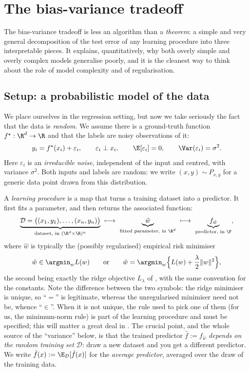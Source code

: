 \section{The bias-variance tradeoff}
\label{sec:bias-variance}

The bias-variance tradeoff is less an algorithm than a \emph{theorem}: a simple
and very general decomposition of the test error of any learning procedure into
three interpretable pieces. It explains, quantitatively, why both overly simple
and overly complex models generalise poorly, and it is the cleanest way to think
about the role of model complexity and of regularisation.

\subsection{Setup: a probabilistic model of the data}

We place ourselves in the regression setting, but now we take seriously the fact
that the data is \emph{random}. We assume there is a ground-truth function
$f^\star : \R^d \to \R$ and that the labels are noisy observations of it:
\[
y_i = f^\star(x_i) + \varepsilon_i, \qquad
\varepsilon_i \perp x_i, \qquad
\E[\varepsilon_i] = 0, \qquad
\Var(\varepsilon_i) = \sigma^2 .
\]
Here $\varepsilon_i$ is an \emph{irreducible noise}, independent of the input and
centred, with variance $\sigma^2$. Both inputs and labels are random: we write
$(x, y) \sim P_{x,y}$ for a generic data point drawn from this distribution.

A \emph{learning procedure} is a map that turns a training dataset into a
predictor. It first fits a parameter, and then returns the associated function:
\[
\underbrace{\mathcal{D} = \big( (x_1, y_1), \dots, (x_n, y_n) \big)}_{\text{dataset, in } (\R^d \times \R)^n}
\ \longmapsto \
\underbrace{\hat w}_{\text{fitted parameter, in } \R^d}
\ \longmapsto \
\underbrace{f_{\hat w}}_{\text{predictor, in } \F} ,
\]
where $\hat w$ is typically the (possibly regularised) empirical risk minimiser
\[
\hat w \in \argmin_{w} L(w)
\qquad \text{or} \qquad
\hat w = \argmin_{w} \Big\{ L(w) + \frac{\lambda}{2} \Vert w \Vert^2 \Big\} ,
\]
the second being exactly the ridge objective $L_\lambda$ of , with
the same convention for the constants. Note the difference between the two symbols:
the ridge minimiser is unique, so ``$=$'' is legitimate, whereas the unregularised
minimiser need not be, whence ``$\in$''. When it is not unique, the rule used to pick
one of them (for us, the minimum-norm rule) is part of the learning procedure and
must be specified; this will matter a great deal in \Cref{subsec:double-descent}.
The crucial point, and the whole source of the ``variance'' below, is that the
trained predictor $\hat f := f_{\hat w}$ \emph{depends on the random training set}
$\mathcal{D}$: draw a new dataset and you get a different predictor. We write
$\bar f(x) := \E_{\mathcal{D}}[\hat f(x)]$ for the \emph{average predictor},
averaged over the draw of the training data.

